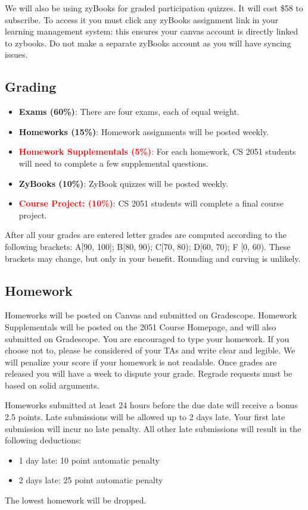 \documentclass{article}
\begin{document}
    \vspace{3mm}
    We will also be using zyBooks for graded participation quizzes. It will cost \$58 to subscribe. To access it you must click any zyBooks assignment link in your learning management system: this ensures your canvas account is directly linked to zybooks.  Do not make a separate zyBooks account as you will have syncing issues.

\subsection*{Grading}
    \begin{itemize}
        \item \textbf{Exams (60\%)}: There are four exams, each of equal weight.
        \item \textbf{Homeworks (15\%)}: Homework assignments will be posted weekly.
        \item \textcolor{red}{\textbf{Homework Supplementals (5\%)}:} For each homework, CS 2051 students will need to complete a few supplemental questions.
        \item \textbf{ZyBooks (10\%)}: ZyBook quizzes will be posted weekly.
        \item \textcolor{red}{\textbf{Course Project: (10\%)}}: CS 2051 students will complete a final course project.
    \end{itemize}
    After all your grades are entered letter grades are computed according to the following brackets: A[90, 100]; B[80, 90);
    C[70, 80); D[60, 70); F [0, 60). These brackets may change, but only in your benefit. Rounding and curving is unlikely.

\subsection*{Homework}
    Homeworks will be posted on Canvas and submitted on Gradescope. Homework Supplementals will be posted on the 2051 Course Homepage, and will also submitted on Gradescope.  You are encouraged to type your homework. If you choose not to, please be considered of your TAs and write clear and legible. We will penalize your score if your homework is not readable. Once grades are released you will have a week to dispute your grade. Regrade requests must be based on solid arguments.

    \vspace{3mm}
    Homeworks submitted at least 24 hours before the due date will receive a bonus 2.5 points. Late submissions will be allowed up to 2 days late.  Your first late submission will incur no late penalty. All other late submissions will result in the following deductions: 
    \begin{itemize}
        \item 1 day late: 10 point automatic penalty 
        \item 2 days late: 25 point automatic penalty
    \end{itemize}
    The lowest homework will be dropped.
    
\end{document}

